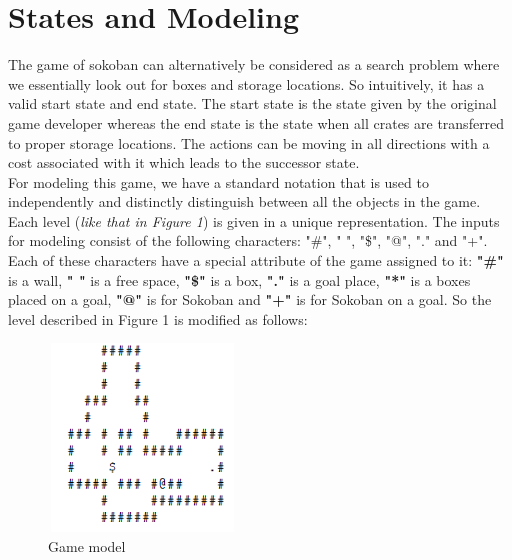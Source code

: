 \documentclass[10pt, final]{article}
\newcommand{\br}[1][.75]{\ \\[#1\baselineskip]}
\begin{document}
\section{States and Modeling}
The game of sokoban can alternatively be considered as a search problem where we essentially look out for boxes and storage locations. So intuitively, it has a valid start state and end state. The start state is the state given by the original game developer whereas the end state is the state when all crates are transferred to proper storage locations. The actions can be moving in all directions with a cost associated with it which leads to the successor state. \br
For modeling this game, we have a standard notation that is used to independently and distinctly distinguish between all the objects in the game. Each level (\textit{like that in Figure 1}) is given in a unique representation. The inputs for modeling consist of the following characters: "\#", " ", "\$", "@", "." and "+". Each of these characters have a special attribute of the game assigned to it: \textbf{"\#"} is a wall,  \textbf{" "} is a free space, \textbf{"\$"} is a box, \textbf{"."} is a goal place,  \textbf{"*"} is a boxes placed on a goal, \textbf{"@"} is for Sokoban and \textbf{"+"} is for Sokoban on a goal. So the level described in Figure 1 is modified as follows:  \\
	\begin{figure}[h!]
	\centering
	\includegraphics[width=5cm, height=5cm]{pic4.png}
	\caption{Game model}
\end{figure}
\end{document}
